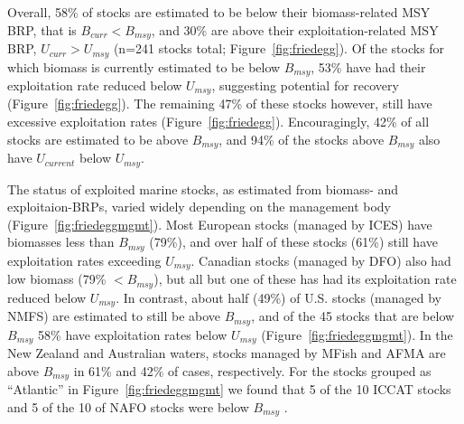 

Overall, 58\% of stocks are estimated to be below
their biomass-related MSY BRP, that is $B_{curr}<B_{msy}$, and
30\% are above their
exploitation-related MSY BRP, $U_{curr}>U_{msy}$
(n=241 stocks total; Figure~\ref{fig:friedegg}).
Of the stocks for which biomass is currently estimated to be below $B_{msy}$,
53\% have had their
exploitation rate reduced below $U_{msy}$, suggesting potential for
recovery (Figure~\ref{fig:friedegg}). The remaining
47\% of these stocks however,
still have excessive exploitation rates (Figure~\ref{fig:friedegg}).
Encouragingly, 42\% of all stocks are
estimated to be above $B_{msy}$, and 94\% of the
stocks above $B_{msy}$ also have $U_{current}$ below $U_{msy}$. 




The status of exploited marine stocks, as estimated from biomass- and
exploitaion-BRPs, varied widely depending on the management body
(Figure~\ref{fig:friedeggmgmt}). Most European stocks (managed by
ICES) have biomasses less than $B_{msy}$
(79\%), and over half of these
stocks (61\%) still
have exploitation rates exceeding $U_{msy}$. Canadian stocks (managed
by DFO) also had low biomass (79\%
$< B_{msy}$), but all but one of these has had its exploitation rate
reduced below $U_{msy}$. In contrast, about half
(49\%) of U.S. stocks (managed by
NMFS) are estimated to still be above $B_{msy}$, and of the
45 stocks that are below $B_{msy}$
58\% have exploitation
rates below $U_{msy}$ (Figure~\ref{fig:friedeggmgmt}). In the New
Zealand and Australian waters, stocks managed by MFish and AFMA are
above $B_{msy}$ in 61\% and
42\% of cases, respectively. For
the stocks grouped as ``Atlantic'' in Figure~\ref{fig:friedeggmgmt} we
found that 5 of the
10 ICCAT stocks and
5 of the
10 of NAFO stocks were below $B_{msy}$ .

